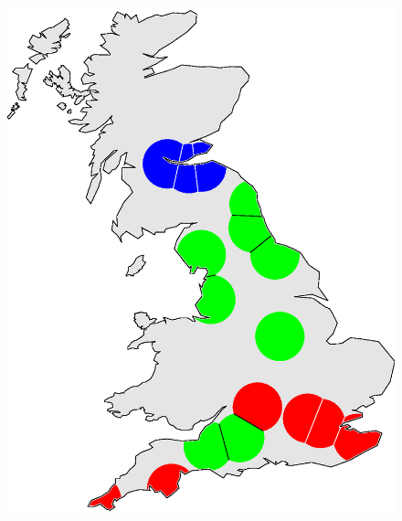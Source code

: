 \documentclass[output=paper]{LSP/langsci}
\begin{document}
\begin{figure}
\begin{minipage}[b]{0.30\linewidth} %
    \centering
    \includegraphics [keepaspectratio,width=.98\textwidth] {illustrations/wolk_noisy_cluster_normalized_fredS-3groups.eps}
\end{minipage}
\begin{minipage}[b]{0.30\linewidth} %
    \centering

\end{minipage}
\end{figure}
\end{document}
